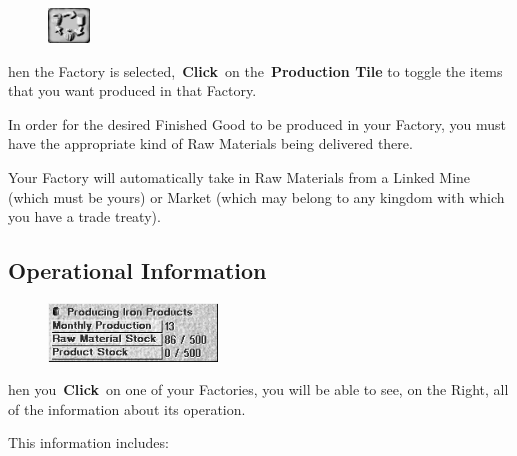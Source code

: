
\begin{figure}
	\vspace{-20pt}
	\begin{center}
		\includegraphics[width=0.1\textwidth]{Tgoodcycling}
	\end{center}
	\vspace{-20pt}
\end{figure}

hen the Factory is selected, \textbf{Click} on the \textbf{Production Tile} to toggle the items that you want produced in that Factory.

In order for the desired Finished Good to be produced in your Factory, you must have the appropriate kind of Raw Materials being delivered there.

Your Factory will automatically take in Raw Materials from a Linked Mine (which must be yours) or Market (which may belong to any kingdom with which you have a trade treaty).

\subsection{Operational Information}


\begin{figure}
	\vspace{-20pt}
	\begin{center}
		\includegraphics[width=0.4\textwidth]{Ifactoryinfo}
	\end{center}
	\vspace{-20pt}
\end{figure}

hen you \textbf{Click} on one of your Factories, you will be able to see, on the Right, all of the information about its operation.

This information includes:

